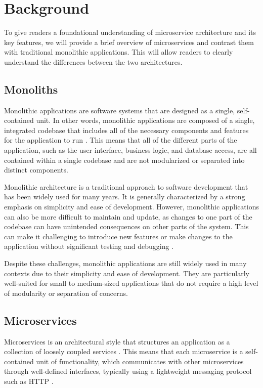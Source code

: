 \documentclass[conference]{IEEEtran}
\begin{document}
\section{Background}

To give readers a foundational understanding of microservice architecture and
its key features, we will provide a brief overview of microservices and
contrast them with traditional monolithic applications. This will allow readers
to clearly understand the differences between the two architectures.

\subsection{Monoliths}

Monolithic applications are software systems that are designed as a single,
self-contained unit. In other words, monolithic applications are composed of a
single, integrated codebase that includes all of the necessary components and
features for the application to run \cite{kazanavivcius2019migrating}. This
means that all of the different parts of the application, such as the user
interface, business logic, and database access, are all contained within a
single codebase and are not modularized or separated into distinct components.

Monolithic architecture is a traditional approach to software development that
has been widely used for many years. It is generally characterized by a strong
emphasis on simplicity and ease of development. However, monolithic
applications can also be more difficult to maintain and update, as changes to
one part of the codebase can have unintended consequences on other parts of the
system. This can make it challenging to introduce new features or make changes
to the application without significant testing and debugging
\cite{kazanavivcius2019migrating}.

Despite these challenges, monolithic applications are still widely used in many
contexts due to their simplicity and ease of development. They are particularly
well-suited for small to medium-sized applications that do not require a high
level of modularity or separation of concerns.

\subsection{Microservices}

Microservices is an architectural style that structures an application as a
collection of loosely coupled services \cite{newman2021building}. This means
that each microservice is a self-contained unit of functionality, which
communicates with other microservices through well-defined interfaces,
typically using a lightweight messaging protocol such as HTTP
\cite{fowler-microservices}.
\end{document}
